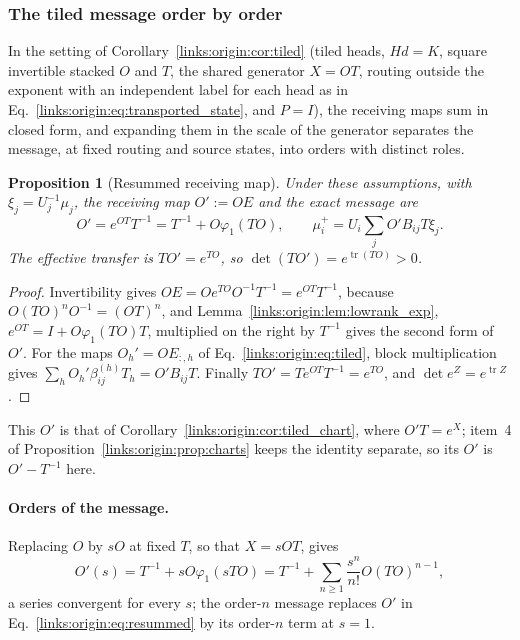 \documentclass[11pt]{article}
\newtheorem{proposition}[theorem]{Proposition}
\theoremstyle{definition}
\theoremstyle{remark}
\providecommand{\tr}{\operatorname{tr}}
\begin{document}
\subsubsection{The tiled message order by order}
\label{links:origin:sec:orders}

In the setting of Corollary~\ref{links:origin:cor:tiled} (tiled heads, $Hd=K$, square invertible stacked $O$ and $T$, the shared generator $X=OT$, routing outside the exponent with an independent label for each head as in Eq.~\eqref{links:origin:eq:transported_state}, and $P=I$), the receiving maps sum in closed form, and expanding them in the scale of the generator separates the message, at fixed routing and source states, into orders with distinct roles.

\begin{proposition}[Resummed receiving map]
\label{links:origin:prop:resummed}
Under these assumptions, with $\xi_j=U_j^{-1}\mu_j$, the receiving map $O':=OE$ and the exact message are
\begin{equation}
O'=e^{OT}T^{-1}=T^{-1}+O\varphi_1(TO),\qquad
\mu_i^+=U_i\sum_jO'B_{ij}T\xi_j.
\label{links:origin:eq:resummed}
\end{equation}
The effective transfer is $TO'=e^{TO}$, so $\det(TO')=e^{\tr(TO)}>0$.
\end{proposition}

\begin{proof}
Invertibility gives $OE=Oe^{TO}O^{-1}T^{-1}=e^{OT}T^{-1}$, because $O(TO)^nO^{-1}=(OT)^n$, and Lemma~\ref{links:origin:lem:lowrank_exp}, $e^{OT}=I+O\varphi_1(TO)T$, multiplied on the right by $T^{-1}$ gives the second form of $O'$. For the maps $O_h'=OE_{:,h}$ of Eq.~\eqref{links:origin:eq:tiled}, block multiplication gives $\sum_hO_h'\beta_{ij}^{(h)}T_h=O'B_{ij}T$. Finally $TO'=Te^{OT}T^{-1}=e^{TO}$, and $\det e^{Z}=e^{\tr Z}$.
\end{proof}

This $O'$ is that of Corollary~\ref{links:origin:cor:tiled_chart}, where $O'T=e^{X}$; item~4 of Proposition~\ref{links:origin:prop:charts} keeps the identity separate, so its $O'$ is $O'-T^{-1}$ here.

\paragraph{Orders of the message.}
Replacing $O$ by $sO$ at fixed $T$, so that $X=sOT$, gives
\begin{equation}
O'(s)=T^{-1}+sO\varphi_1(sTO)=T^{-1}+\sum_{n\ge1}\frac{s^n}{n!}O(TO)^{n-1},
\label{links:origin:eq:orders}
\end{equation}
a series convergent for every $s$; the order-$n$ message replaces $O'$ in Eq.~\eqref{links:origin:eq:resummed} by its order-$n$ term at $s=1$.
\end{document}
